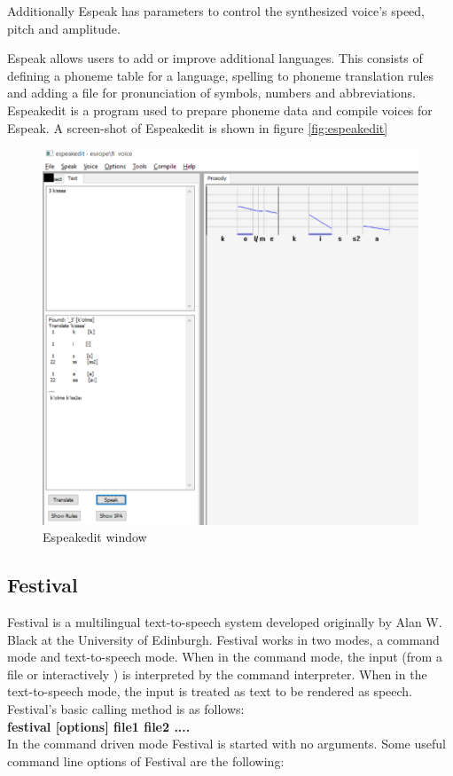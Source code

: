 \documentclass[11pt,a4paper,oneside,article]{memoir}
\begin{document}
\setlength{\leftskip}{0pt}

Additionally Espeak has parameters to control the synthesized voice's speed, pitch and amplitude.

Espeak allows users to add or improve additional languages. This consists of defining a phoneme table for a language, spelling to phoneme translation rules and adding a file for pronunciation of symbols, numbers and abbreviations. Espeakedit is a program used to prepare phoneme data and compile voices for Espeak. A screen-shot of Espeakedit is shown in figure \vref{fig:espeakedit}

\begin{figure}[h]
  \includegraphics[width=15cm]{espeakedit}
  \caption{Espeakedit window}
  \label{fig:espeakedit}
\end{figure}

\subsection{Festival}
Festival is a multilingual text-to-speech system developed originally by Alan W. Black at the  University of Edinburgh. \cite{hut} Festival works in two modes, a command mode and text-to-speech mode. When in the command mode, the input (from a file or interactively ) is interpreted by the command interpreter. When in the text-to-speech mode, the input is treated as text to be rendered as speech.
Festival's basic calling method is as follows:\\
\textbf{festival [options] file1 file2 ....}\\
In the command driven mode Festival is started with no arguments. Some useful command line options of Festival are the following:\\
\end{document}
